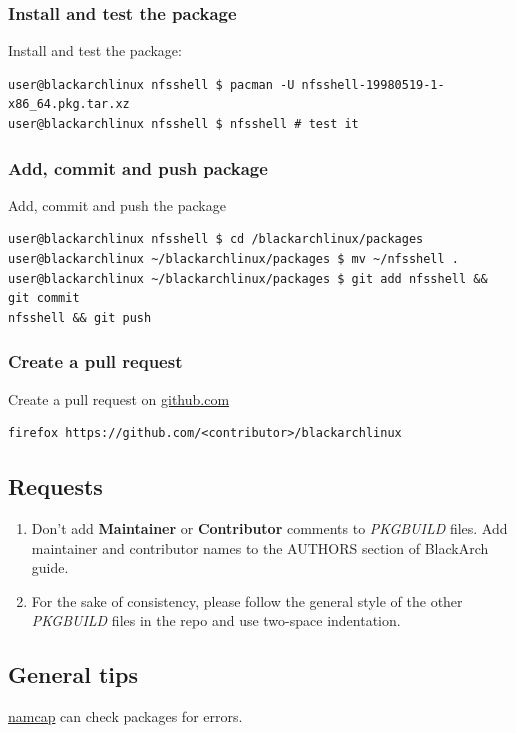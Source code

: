 \documentclass[a4paper, oneside, 11pt]{book}
\begin{document}
\subsubsection{Install and test the package}
Install and test the package:
{\small
\color{gray}
\begin{verbatim}
user@blackarchlinux nfsshell $ pacman -U nfsshell-19980519-1-x86_64.pkg.tar.xz
user@blackarchlinux nfsshell $ nfsshell # test it
\end{verbatim}
}

\subsubsection{Add, commit and push package}
Add, commit and push the package
{\small
\color{gray}
\begin{verbatim}
user@blackarchlinux nfsshell $ cd /blackarchlinux/packages
user@blackarchlinux ~/blackarchlinux/packages $ mv ~/nfsshell .
user@blackarchlinux ~/blackarchlinux/packages $ git add nfsshell && git commit
nfsshell && git push
\end{verbatim}
}

\subsubsection{Create a pull request}
Create a pull request on \href{https://github.com/}{github.com}
{\small
\color{gray}
\begin{verbatim}
firefox https://github.com/<contributor>/blackarchlinux
\end{verbatim}
}

\subsection{Requests}
\begin{enumerate}
\item Don't add \textbf{Maintainer} or \textbf{Contributor} comments to
\textit{PKGBUILD} files. Add maintainer and contributor names to the
AUTHORS section of BlackArch guide.
\item For the sake of consistency, please follow the general style of the other
\textit{PKGBUILD} files in the repo and use two-space indentation.
\end{enumerate}

\subsection{General tips}
\href{http://wiki.archlinux.org/index.php/Namcap}{namcap} can check packages for
errors.

\appendix

\end{document}
